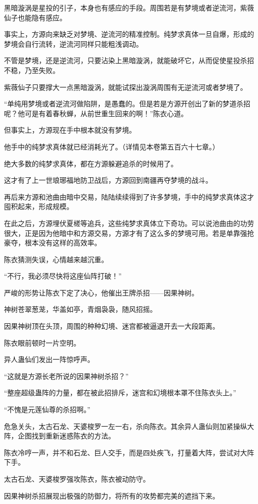\begin{this_body}
黑暗漩涡是星投的引子，本身也有感应的手段。周围若是有梦境或者逆流河，紫薇仙子也能隐有感应。

事实上，方源向来缺乏对梦境、逆流河的精准控制。纯梦求真体一旦自爆，形成的梦境会自行流转，逆流河同样只能粗浅调动。

不管是梦境，还是逆流河，只要沾染上黑暗漩涡，就能破坏它，从而促使星投杀招不稳，乃至失败。

紫薇仙子只要撑大一点黑暗漩涡，就能试探出漩涡周围有无逆流河或者梦境了。

“单纯用梦境或者逆流河做陷阱，是愚蠢的。但是若是方源开创出了新的梦道杀招呢？他可是有着春秋蝉，从前世重生回来的啊！”陈衣心道。

但事实上，方源现在手中根本就没有梦境。

他手中的纯梦求真体就已经消耗光了。（详情见本卷第五百六十七章。）

绝大多数的纯梦求真体，都在方源躲避追杀的时候用了。

这才有了上一世琅琊福地防卫战后，方源回到南疆再夺梦境的战斗。

再后来方源和池曲由暗中交易，陆陆续续得到了许多梦境，手中的纯梦求真体这才囤积起来，形成规模。

在此之后，方源埋伏夏槎等追兵，这些纯梦求真体立下奇功。可以说池曲由的功劳很大，正是因为他暗中和方源交易，方源才有了这么多的梦境可用。若是单靠强抢豪夺，根本没有这样的高效率。

陈衣猜测失误，心情越来越沉重。

“不行，我必须尽快将这座仙阵打破！”

严峻的形势让陈衣下定了决心，他催出王牌杀招——因果神树。

神树苍翠葱茏，华盖如亭，青烟袅袅，随风招摇。

因果神树顶在头顶，周围的种种幻境、迷宫都被逼退开去一大段距离。

陈衣眼前顿时一片空明。

异人蛊仙们发出一阵惊呼声。

“这就是方源长老所说的因果神树杀招？”

“整座超级蛊阵的力量，都在被此招排斥，迷宫和幻境根本罩不住陈衣头上。”

“不愧是元莲仙尊的杀招啊。”

危急关头，太古石龙、天婆梭罗一左一右，杀向陈衣。其余异人蛊仙则加紧操纵大阵，企图找到重新迷惑陈衣的方法。

陈衣冷哼一声，并不和石龙、巨人交手，而是四处疾飞，打量着大阵，尝试对大阵下手。

太古石龙、天婆梭罗强攻陈衣，陈衣被动防守。

因果神树杀招展现出极强的防御力，将所有的攻势都完美的遮挡下来。


\end{this_body}

